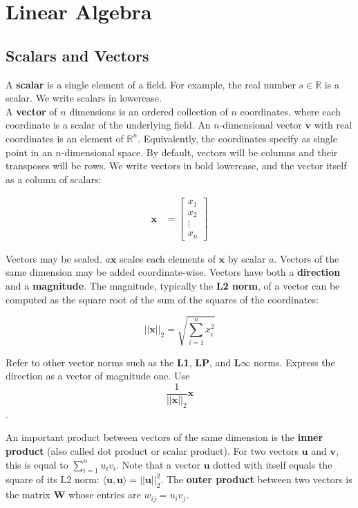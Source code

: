 \documentclass{harvardml}
\theoremstyle{definition}
\theoremstyle{plain}
\newcommand{\R}{\mathbb{R}}
\renewcommand{\v}[1]{\mathbf{#1}}
\begin{document}
\section{Linear Algebra}
    \subsection{Scalars and Vectors}
		A \textbf{scalar} is a single element
		of a field. For example, the real number $s \in \R$
		is a scalar. We write scalars in lowercase.\\

		\noindent A \textbf{vector} of $n$ dimensions is an ordered
		collection of $n$ coordinates, where each coordinate is a scalar
		of the underlying field. An $n$-dimensional vector $\v v$ with
		real coordinates is an element of $\R^n$. Equivalently, the 
		coordinates specify as single point in an $n$-dimensional space. 
		By default, vectors will be columns and their transposes will be 
		rows. We write vectors in bold lowercase, and the vector itself 
		as a column of scalars:

		\begin{align*}
    		\mathbf{x} &= \begin{bmatrix}
           					x_{1} \\
           					x_{2} \\
           					\vdots \\
           					x_{n}
         				  \end{bmatrix}
  		\end{align*}


		\noindent Vectors may be scaled. $a\v x$ scales 
		each elements of $\v x$ by scalar $a$. Vectors
		of the same dimension may be added coordinate-wise. 
		Vectors have both a \textbf{direction} and a
		\textbf{magnitude}. The magnitude, typically the
		\textbf{L2 norm}, of a vector can be computed as the
		square root of the sum of the squares of the coordinates:
		
		$$ ||\v x||_2 = \sqrt{\sum_{i=1}^{n} x_i^2} $$

		\noindent Refer to other vector norms
        such as the \textbf{L1}, \textbf{LP}, and
        \textbf{L}$\boldsymbol{\infty}$ norms. 
        Express the direction  as a vector of magnitude one. 
        Use $$ \frac{1}{||\mathbf{x}||_2}\mathbf{x} $$.
        
        \noindent An important product between vectors of the
                  same dimension is the \textbf{inner product} 
                  (also called dot product or scalar product).
                  For two vectors $\mathbf{u}$ and $\mathbf{v}$,
                  this is equal to $\sum_{i=1}^nu_iv_i$. Note that
                  a vector $\mathbf{u}$ dotted with itself equals
                  the square of its L2 norm: $\langle \mathbf{u},
                  \mathbf{u} \rangle = ||\mathbf{u}||_2^2$. The 
                  \textbf{outer product} between two vectors is
                  the matrix $\mathbf{W}$ whose entries are
                  $w_{ij} = u_iv_j$.
   
\end{document}
